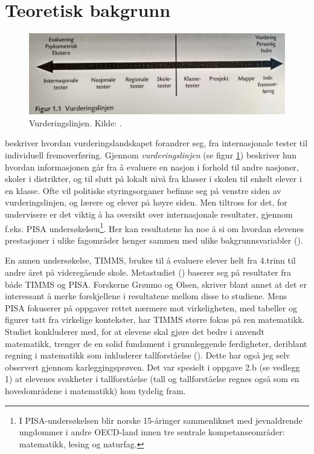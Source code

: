 \documentclass[main.tex]{subfiles}
\begin{document}
\section*{Teoretisk bakgrunn}

\begin{figure}[h!]
\centering
\includegraphics[scale = 0.1]{../figures/vurderingslinjen.png}
\caption{Vurderingslinjen. Kilde: \protect{}.}
\label{fig:smit09}
\end{figure}

 beskriver hvordan vurderingslandskapet forandrer seg, fra internasjonale tester til
individuell fremoverføring. Gjennom \emph{vurderingslinjen} (se figur \ref{fig:smit09}) beskriver hun
hvordan informasjonen går fra å evaluere en nasjon i forhold til andre nasjoner, skoler i distrikter, 
og til slutt på lokalt nivå fra klasser i skolen til enkelt elever i en klasse. Ofte vil politiske styringsorganer
befinne seg på venstre siden av vurderingslinjen, og lærere og elever på høyre siden. Men tiltross for det, 
for undervisere er det viktig å ha oversikt over internasjonale resultater, gjennom f.eks. PISA 
undersøkelsen\footnote{I  PISA-undersøkelsen blir norske 15-åringer sammenliknet med jevnaldrende ungdommer i 
andre OECD-land innen tre sentrale kompetanseområder: matematikk, lesing og naturfag.}. 
Her kan resultatene ha noe å si om hvordan elevenes prestasjoner i ulike fagområder henger sammen med ulike 
bakgrunnsvariabler (). 

En annen undersøkelse, TIMMS, brukes til å evaluere elever helt fra 4.trinn
til andre året på videregående skole. Metastudiet () baserer seg på resultater fra både TIMMS og PISA. 
Forskerne Grønmo og Olsen, skriver blant annet at det er interessant å merke forskjellene i resultatene mellom disse to 
studiene. Mens PISA fokuserer på oppgaver rettet nærmere mot virkeligheten, med tabeller og figurer tatt fra virkelige
kontekster, har TIMMS større fokus på ren matematikk. Studiet konkluderer med, for at elevene skal gjøre det bedre
i anvendt matematikk, trenger de en solid fundament i grunnleggende ferdigheter, deriblant regning i matematikk som
inkluderer tallforståelse (). Dette har også jeg selv observert gjennom karleggingsprøven. Det var 
spesielt i oppgave 2.b (se vedlegg 1) at elevenes svakheter i tallforståelse (tall og tallforståelse regnes også
som en hovedområdene i matematikk) kom tydelig fram.
\end{document}
